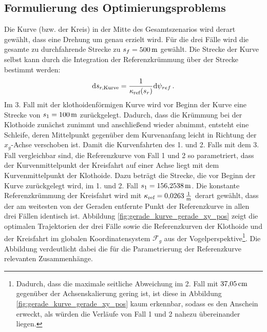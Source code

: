 \subsection{Formulierung des Optimierungsproblems}
Die Kurve (bzw. der Kreis) in der Mitte des Gesamtszenarios wird derart gewählt, dass eine Drehung um genau  erzielt wird. Für die drei Fälle wird die gesamte zu durchfahrende Strecke zu $s_f = 500\,\mathrm{m}$ gewählt. Die Strecke der Kurve selbst kann durch die Integration der Referenzkrümmung über der Strecke bestimmt werden:
\begin{equation}
	\textrm{d}{s_{r,\textrm{Kurve}}} = \frac{1}{\kappa_{\textrm{ref}}(s_r)}\textrm{d}{\psi_{ref}} \,. \label{eq:Kurvenstrecke}
\end{equation}
Im 3. Fall mit der klothoidenförmigen Kurve wird vor Beginn der Kurve eine Strecke von $s_1 = 100\,\mathrm{m}$ zurückgelegt. Dadurch, dass die Krümmung bei der Klothoide zunächst zunimmt und anschließend wieder abnimmt, entsteht eine Schleife, deren Mittelpunkt gegenüber dem Kurvenanfang leicht in Richtung der $x_g$-Achse verschoben ist. Damit die Kurvenfahrten des 1. und 2. Falls mit dem 3. Fall vergleichbar sind, die Referenzkurve von Fall 1 und 2 so parametriert, dass der Kurvenmittelpunkt der Kreisfahrt auf einer Achse liegt mit dem Kurvenmittelpunkt der Klothoide. Dazu beträgt die Strecke, die vor Beginn der Kurve zurückgelegt wird, im 1. und 2. Fall $s_1 = 156{,}2538\,\mathrm{m}$. Die konstante Referenzkrümmung der Kreisfahrt wird mit $\kappa_{\textrm{ref}} = 0{,}0263\,\mathrm{\frac{\mathrm{1}}{\mathrm{m}}}$ derart gewählt, dass der am weitesten von der Geraden entfernte Punkt der Referenzkurve in allen drei Fällen identisch ist. Abbildung \ref{fig:gerade_kurve_gerade_xy_pos} zeigt die optimalen Trajektorien der drei Fälle sowie die Referenzkurven der Klothoide und der Kreisfahrt im globalen Koordinatensystem $\mathcal{F}_g$ aus der Vogelperspektive\footnote{Dadurch, dass die maximale seitliche Abweichung im 2. Fall mit $37{,}05\,\mathrm{cm}$ gegenüber der Achsenskalierung gering ist, ist diese in Abbildung \ref{fig:gerade_kurve_gerade_xy_pos} kaum erkennbar, sodass es den Anschein erweckt, als würden die Verläufe von Fall 1 und 2 nahezu übereinander liegen.}. Die Abbildung verdeutlicht dabei die für die Parametrierung der Referenzkurve relevanten Zusammenhänge. 
